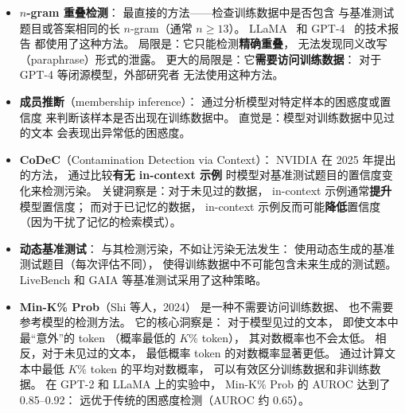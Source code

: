 \begin{itemize}[noitemsep]
  \item \textbf{$n$-gram 重叠检测}：
        最直接的方法——检查训练数据中是否包含
        与基准测试题目或答案相同的长 $n$-gram（通常 $n \geq 13$）。
        LLaMA~\cite{touvron2023llama} 和
        GPT-4~\cite{openai2023gpt4} 的技术报告
        都使用了这种方法。
        局限是：它只能检测\textbf{精确重叠}，
        无法发现同义改写（paraphrase）形式的泄露。
        更大的局限是：它\textbf{需要访问训练数据}：
        对于 GPT-4 等闭源模型，外部研究者
        无法使用这种方法。
  \item \textbf{成员推断}（membership inference）：
        通过分析模型对特定样本的困惑度或置信度
        来判断该样本是否出现在训练数据中。
        直觉是：模型对训练数据中见过的文本
        会表现出异常低的困惑度。
  \item \textbf{CoDeC}（Contamination Detection via Context）：
        NVIDIA 在 2025 年提出的方法，
        通过比较\textbf{有无 in-context 示例}
        时模型对基准测试题目的置信度变化来检测污染。
        关键洞察是：对于未见过的数据，
        in-context 示例通常\textbf{提升}模型置信度；
        而对于已记忆的数据，
        in-context 示例反而可能\textbf{降低}置信度
        （因为干扰了记忆的检索模式）。
  \item \textbf{动态基准测试}：
        与其检测污染，不如让污染无法发生：
        使用动态生成的基准测试题目（每次评估不同），
        使得训练数据中不可能包含未来生成的测试题。
        LiveBench 和 GAIA 等基准测试采用了这种策略。
  \item \textbf{Min-K\% Prob}（Shi 等人，2024）%
        是一种不需要访问训练数据、
        也不需要参考模型的检测方法。
        它的核心洞察是：
        对于模型见过的文本，
        即使文本中最“意外”的 token
        （概率最低的 $K\%$ token），
        其对数概率也不会太低。
        相反，对于未见过的文本，
        最低概率 token 的对数概率显著更低。
        通过计算文本中最低 $K\%$ token 的平均对数概率，
        可以有效区分训练数据和非训练数据。
        在 GPT-2 和 LLaMA 上的实验中，
        Min-K\% Prob 的 AUROC 达到了 0.85--0.92：
        远优于传统的困惑度检测（AUROC 约 0.65）。
\end{itemize}

